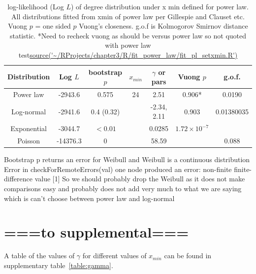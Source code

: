 \begin{table}[]
    \centering
    
    \begin{tabular}{ccccccc}
    \toprule
        Distribution & Log $L$ & bootstrap $p$ & $x_{min}$ & $\gamma$ or pars & Vuong $p$  &g.o.f.\\
        \midrule
        Power law &  -2943.6 & 0.575 & 24 & 2.51 & 0.906* &  0.0190\\
        Log-normal & -2941.6 & 0.4 (0.32) &&-2.34, 2.11& 0.903 &  0.01380035\\
        Exponential & -3044.7 & $<0.01$&&0.0285& $1.72\times10^{-7}$\\
        Poisson & -14376.3 & 0&&58.59 & & 0.088\\
    
        \bottomrule
    \end{tabular}
    \caption[Log $L$ of degree distribution under different models]{log-likelihood (Log $L$) of degree distribution under x min defined for power law. All distributions fitted from xmin of power law per Gillespie and Clauset etc. Vuong $p$ = one sided $p$ Vuong's closeness. g.o.f is Kolmogorov Smirnov distance statistic. *Need to recheck vuong as should be versus power law so not quoted with power law test\url{source('~/RProjects/chapter3/R/fit_power_law/fit_pl_setxmin.R')} }
    \tiny{Bootstrap p returns an error for Weibull and Weibull is a continuous distribution Error in checkForRemoteErrors(val) one node produced an error: non-finite finite-difference value [1] So we should probably drop the Weibull as it does not make comparisons easy and probably does not add very much to what we are saying which is can't choose between power law and log-normal}
    \label{tab:ll distributions}
\end{table}

\section{===to supplemental===}
  A table of the values of $\gamma$ for different values of $x_{min}$ can be found in supplementary table~\ref{table:gamma}.

